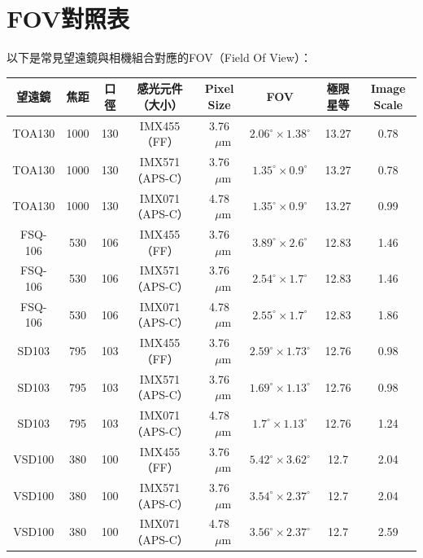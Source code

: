 \section{FOV對照表}
以下是常見望遠鏡與相機組合對應的FOV（Field Of View）：
\newline

{
    \centering
    \begin{tabular}{ c | c | c | c | c | c | c | c}
        望遠鏡 & 焦距 & 口徑 & 感光元件（大小） & Pixel Size & FOV & 極限星等 & Image Scale\\
        \hline
        TOA130 & 1000 & 130 & IMX455（FF） & 3.76\(\text{ }\mu\text{m}\) & \(2.06^\circ\times1.38^\circ\) & 13.27 &  0.78 \\
        TOA130 & 1000 & 130 & IMX571（APS-C） & 3.76\(\text{ }\mu\text{m}\) & \(1.35^\circ\times0.9^\circ\) & 13.27 &  0.78 \\
        TOA130 & 1000 & 130 & IMX071（APS-C） & 4.78\(\text{ }\mu\text{m}\) & \(1.35^\circ\times0.9^\circ\) & 13.27 &  0.99\\
        \hline
        FSQ-106 & 530 & 106 & IMX455（FF） & 3.76\(\text{ }\mu\text{m}\) & \(3.89^\circ\times2.6^\circ\) & 12.83 &  1.46 \\
        FSQ-106 & 530 & 106 & IMX571（APS-C） & 3.76\(\text{ }\mu\text{m}\) & \(2.54^\circ\times1.7^\circ\) & 12.83 &  1.46 \\
        FSQ-106 & 530 & 106 & IMX071（APS-C） & 4.78\(\text{ }\mu\text{m}\) & \(2.55^\circ\times1.7^\circ\) & 12.83 &  1.86 \\
        \hline
        SD103 & 795 & 103 & IMX455（FF） & 3.76\(\text{ }\mu\text{m}\) & \(2.59^\circ\times1.73^\circ\) & 12.76 &  0.98 \\
        SD103 & 795 & 103 & IMX571（APS-C） & 3.76\(\text{ }\mu\text{m}\) & \(1.69^\circ\times1.13^\circ\) & 12.76 &  0.98 \\
        SD103 & 795 & 103 & IMX071（APS-C） & 4.78\(\text{ }\mu\text{m}\) & \(1.7^\circ\times1.13^\circ\) & 12.76 &  1.24 \\
        \hline
        VSD100 & 380 & 100 & IMX455（FF） & 3.76\(\text{ }\mu\text{m}\) & \(5.42^\circ\times3.62^\circ\) & 12.7 &  2.04 \\
        VSD100 & 380 & 100 & IMX571（APS-C） & 3.76\(\text{ }\mu\text{m}\) & \(3.54^\circ\times2.37^\circ\) & 12.7 &  2.04 \\
        VSD100 & 380 & 100 & IMX071（APS-C） & 4.78\(\text{ }\mu\text{m}\) & \(3.56^\circ\times2.37^\circ\) & 12.7 &  2.59 \\

\end{tabular}}
